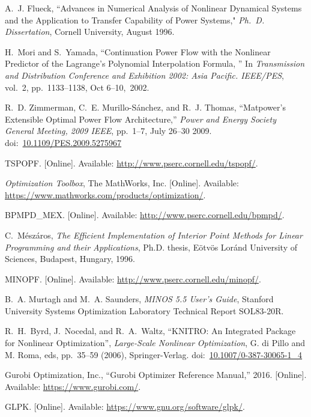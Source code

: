\documentclass[12pt]{article}
\newcommand{\matpower}[0]{{\sc Matpower}}
\newcommand{\doi}[1]{doi:~\href{https://doi.org/#1}{#1}}
\numberwithin{equation}{section}
\numberwithin{table}{section}
\numberwithin{figure}{section}
\begin{document}
\begin{thebibliography}{99}
A.~J. Flueck, ``Advances in Numerical Analysis of Nonlinear Dynamical Systems and the Application to Transfer Capability of Power Systems," \emph{Ph.~D. Dissertation}, Cornell University, August 1996.

H.~Mori and S.~Yamada, ``Continuation Power Flow with the Nonlinear Predictor of the Lagrange's Polynomial Interpolation Formula, '' In {\em Transmission and Distribution Conference and Exhibition 2002:
  Asia Pacific. IEEE/PES}, vol.~2, pp.~1133--1138, Oct 6--10,~2002.

R.~D. Zimmerman, C.~E. Murillo-S{\'a}nchez, and R.~J. Thomas, ``\matpower{}'s
  Extensible Optimal Power Flow Architecture,'' \emph{Power and Energy Society
  General Meeting, 2009 IEEE}, pp.~1--7, July 26--30 2009.
  \doi{10.1109/PES.2009.5275967}

TSPOPF. [Online]. Available: \url{http://www.pserc.cornell.edu/tspopf/}.

\emph{Optimization Toolbox}, The MathWorks, Inc.
  [Online]. Available: \url{https://www.mathworks.com/products/optimization/}.

BPMPD\_MEX. [Online]. Available:
  \url{http://www.pserc.cornell.edu/bpmpd/}.

C.~M{\'e}sz{\'a}ros, \emph{The Efficient Implementation of Interior Point Methods for Linear Programming and their Applications}, Ph.D. thesis,
  E{\"o}tv{\"o}s Lor{\'a}nd University of Sciences, Budapest, Hungary, 1996.

MINOPF. [Online]. Available:
  \url{http://www.pserc.cornell.edu/minopf/}.

B.~A. Murtagh and M.~A. Saunders, \emph{MINOS 5.5 User's Guide}, Stanford
  University Systems Optimization Laboratory Technical Report SOL83-20R.

R.~H.~Byrd, J.~Nocedal, and R.~A.~Waltz, ``KNITRO: An Integrated Package for Nonlinear Optimization'', \emph{Large-Scale Nonlinear Optimization}, G. di Pillo and M. Roma, eds, pp.~35--59 (2006), Springer-Verlag.
doi:~\href{https://doi.org/10.1007/0-387-30065-1_4}{10.1007/0-387-30065-1\_4}

Gurobi Optimization, Inc., ``Gurobi Optimizer Reference Manual,'' 2016. [Online]. Available:
  \url{https://www.gurobi.com/}.

GLPK. [Online]. Available:
  \url{https://www.gnu.org/software/glpk/}.


\end{thebibliography}
\end{document}
